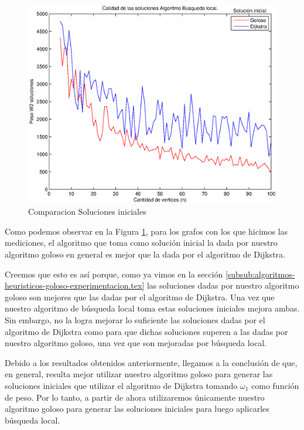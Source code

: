 \begin{figure}[H]
  \begin{center}
    \begin{minipage}{0.5\linewidth}
      \includegraphics[width=\linewidth]{graficos/busq_local_calidad.eps}
      \caption{Comparacion Soluciones iniciales}\label{fig:busq-local-calidad}
    \end{minipage}
  \end{center}
\end{figure}
  
Como podemos observar en la Figura \ref{fig:busq-local-calidad}, para los grafos con los que hicimos las mediciones, el algoritmo que toma como solución inicial la dada por nuestro algoritmo goloso en general es mejor que la dada por el algoritmo de Dijkstra.

Creemos que esto es así porque, como ya vimos en la sección \ref{subsub:algoritmos-heuristicos-goloso-experimentacion.tex} las soluciones dadas por nuestro algoritmo goloso son mejores que las dadas por el algoritmo de Dijkstra. Una vez que nuestro algoritmo de búsqueda local toma estas soluciones iniciales mejora ambas. Sin embargo, no la logra mejorar lo suficiente las soluciones dadas por el algoritmo de Dijkstra como para que dichas soluciones superen a las dadas por nuestro algoritmo goloso, una vez que son mejoradas por búsqueda local.

Debido a los resultados obtenidos anteriormente, llegamos a la conclusión de que, en general, resulta mejor utilizar nuestro algoritmo goloso para generar las soluciones iniciales que utilizar el algoritmo de Dijkstra tomando $\omega_1$ como función de peso. Por lo tanto, a partir de ahora utilizaremos únicamente nuestro algoritmo goloso para generar las soluciones iniciales para luego aplicarles búsqueda local.